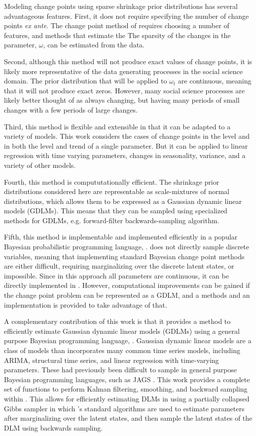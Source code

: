 Modeling change points using sparse shrinkage prior distributions has several advantageous features.
First, it does not require specifying the number of change points \textit{ex ante}.
The change point method of \textcite{Chib1998} requires choosing a number of features, and methods that estimate the 
The sparsity of the changes in the parameter, $\omega$, can be estimated from the data. 

Second, although this method will not produce exact values of change points, it is likely more representative of the data generating processes in the social science domain.
The prior distribution that will be applied to $\omega_{t}$ are continuous, meaning that it will not produce exact zeros.
However, many social science processes are likely better thought of as always changing, but having many periods of small changes with a few periods of large changes.

Third, this method is flexible and extensible in that it can be adapted to a variety of models.
This work considers the cases of change points in the level and in both the level and trend of a single parameter. 
But it can be applied to linear regression with time varying parameters, changes in seasonality, variance, and a variety of other models.

Fourth, this method is compututationally efficient.
The shrinkage prior distributions considered here are representable as scale-mixtures of normal distributions, which allows them to be expressed as a Gaussian dynamic linear models (GDLMs).
This means that they can be sampled using specialized methods for GDLMs, e.g. forward-filter backwards-sampling algorithm.

Fifth, this method is implementable and implemented efficiently in a popular Bayesian probabilistic programming language, \Stan{}.
\Stan{} does not directly sample discrete variables, meaning that implementing standard Bayesian change point methods are either difficult, requiring marginalizing over the discrete latent states, or impossible.
Since in this approach all parameters are continuous, it can be directly implemented in \Stan{}.
However, computational improvements can be gained if the change point problem can be represented as a GDLM, and a methods and an implementation is provided to take advantage of that.

A complementary contribution of this work is that it provides a method to efficiently estimate Gaussian dynamic linear models (GDLMs) using a general purpose Bayesian programming language, \Stan{}.
Gaussian dynamic linear models are a class of models than incorporates many common time series models, including ARIMA, structural time series, and linear regression with time-varying parameters.
These had previously been difficult to sample in general purpose Bayesian programming languages, such as JAGS \parencite[477]{Jackman2009}.
This work provides a complete set of functions to perform Kalman filtering, smoothing, and backward sampling within \Stan{}.
This allows for efficiently estimating DLMs in \Stan{} using a partially collapsed Gibbs sampler in which \Stan{}'s standard algorithms are used to estimate parameters after marginalizing over the latent states, and then sample the latent states of the DLM using backwards sampling.

